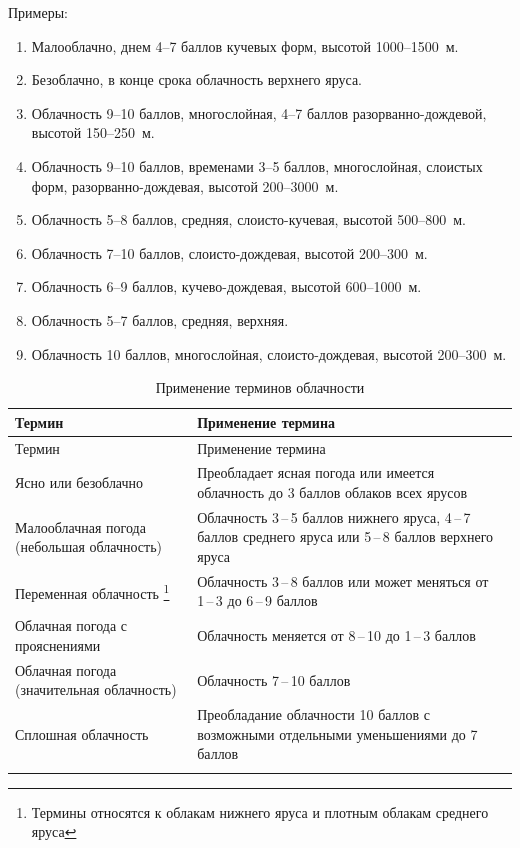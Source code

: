 \documentclass[a4paper, 12pt, twoside, final, book, russian, fittopage, cyremdash, openright]{ncc}
\newcommand{\otdo}{\,--\,}
\begin{document}
Примеры:
\begin{enumerate}[label={}]
\item Малооблачно, днем 4--7 баллов кучевых форм, высотой 1000--1500~м.
\item Безоблачно, в конце срока облачность верхнего яруса.
\item Облачность 9--10 баллов, многослойная, 4--7 баллов разорванно-дождевой, высотой 150--250~м.
\item Облачность 9--10 баллов, временами 3--5 баллов, многослойная, слоистых форм, разорванно-дождевая, высотой 200--3000~м.
\item Облачность 5--8 баллов, средняя, слоисто-кучевая, высотой 500--800~м.
\item Облачность 7--10 баллов, слоисто-дождевая, высотой 200--300~м.
\item Облачность 6--9 баллов, кучево-дождевая, высотой 600--1000~м.
\item Облачность 5--7 баллов, средняя, верхняя.
\item Облачность 10 баллов, многослойная, слоисто-дождевая, высотой 200--300~м.
\end{enumerate}

\begin{longtable}{p{}|p{}}
  \toprule
  Термин & Применение термина \\
  \midrule
  \endfirsthead
  \toprule
  Термин & Применение термина \\
  \midrule
  \endhead
  Ясно или безоблачно
         & Преобладает ясная погода или имеется облачность до 3 баллов облаков всех ярусов \\
  \midrule
  Малооблачная погода (небольшая облачность)
         & Облачность 3\otdo5 баллов нижнего яруса, 4\otdo7 баллов среднего яруса или 5\otdo8 баллов верхнего яруса \\
  \midrule
  Переменная облачность \footnote{Термины относятся к облакам нижнего яруса и плотным облакам среднего яруса}
         & Облачность 3\otdo8 баллов или может меняться от 1\otdo3 до 6\otdo9 баллов \\
  \midrule
  Облачная погода с прояснениями
         & Облачность меняется от 8\otdo10 до 1\otdo3 баллов \\
  \midrule
  Облачная погода (значительная облачность)
         & Облачность 7\otdo10 баллов \\
  \midrule
  Сплошная облачность
         & Преобладание облачности 10 баллов с возможными отдельными уменьшениями до 7 баллов \\
  \bottomrule
  \caption{Применение терминов облачности}
\end{longtable}
\end{document}
